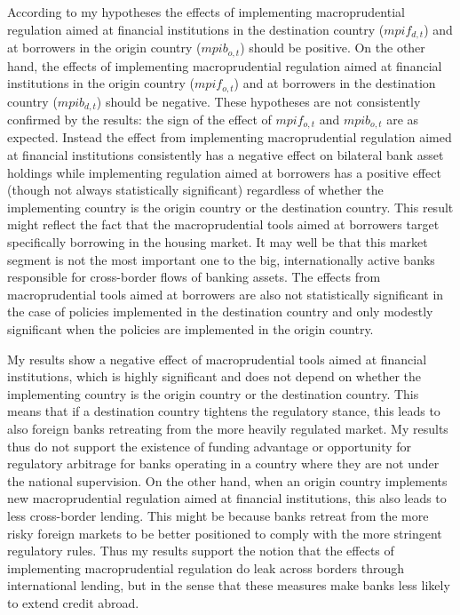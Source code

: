 \documentclass[12pt,a4paper]{article}
\begin{document}
According to my hypotheses the effects of implementing macroprudential regulation aimed at financial institutions in the destination country ($mpif_{d,t}$) and at borrowers in the origin country ($mpib_{o,t}$) should be positive. On the other hand, the effects of implementing macroprudential regulation aimed at financial institutions in the origin country ($mpif_{o,t}$) and at borrowers in the destination country ($mpib_{d,t}$) should be negative. These hypotheses are not consistently confirmed by the results: the sign of the effect of $mpif_{o,t}$ and $mpib_{o,t}$ are as expected. Instead the effect from implementing macroprudential regulation aimed at financial institutions consistently has a negative effect on bilateral bank asset holdings while implementing regulation aimed at borrowers has a positive effect (though not always statistically significant) regardless of whether the implementing country is the origin country or the destination country. This result might reflect the fact that the macroprudential tools aimed at borrowers target specifically borrowing in the housing market. It may well be that this market segment is not the most important one to the big, internationally active banks responsible for cross-border flows of banking assets. The effects from macroprudential tools aimed at borrowers are also not statistically significant in the case of policies implemented in the destination country and only modestly significant when the policies are implemented in the origin country.

My results show a negative effect of macroprudential tools aimed at financial institutions, which is highly significant and does not depend on whether the implementing country is the origin country or the destination country. This means that if a destination country tightens the regulatory stance, this leads to also foreign banks retreating from the more heavily regulated market. My results thus do not support the existence of funding advantage or opportunity for regulatory arbitrage for banks operating in a country where they are not under the national supervision. On the other hand, when an origin country implements new macroprudential regulation aimed at financial institutions, this also leads to less cross-border lending. This might be because banks retreat from the more risky foreign markets to be better positioned to comply with the more stringent regulatory rules. Thus my results support the notion that the effects of implementing macroprudential regulation do leak across borders through international lending, but in the sense that these measures make banks less likely to extend credit abroad.
\end{document}
